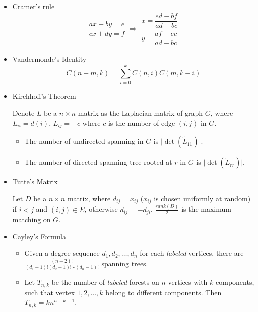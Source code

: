 \begin{itemize}
    \item Cramer's rule
    $$
    \begin{aligned}ax+by=e\\cx+dy=f\end{aligned}
    \Rightarrow
    \begin{aligned}x=\dfrac{ed-bf}{ad-bc}\\y=\dfrac{af-ec}{ad-bc}\end{aligned}
    $$
    
    \item Vandermonde's Identity
    $$
    C(n + m, k) = \sum_{i=0}^k C(n, i)C(m, k - i)
    $$
    
    \item Kirchhoff's Theorem
    
    Denote $L$ be a $n \times n$ matrix as the Laplacian matrix of graph $G$, where $L_{ii} = d(i)$, $L_{ij} = -c$ where $c$ is the number of edge $(i, j)$ in $G$.
    \begin{itemize}
        \itemsep-0.5em
        \item The number of undirected spanning in $G$ is $\lvert \det(\tilde{L}_{11}) \rvert$.
        \item The number of directed spanning tree rooted at $r$ in $G$ is $\lvert \det(\tilde{L}_{rr}) \rvert$.
    \end{itemize}
    
    \item Tutte's Matrix
    
    Let $D$ be a $n \times n$ matrix, where $d_{ij} = x_{ij}$ ($x_{ij}$ is chosen uniformly at random) if $i < j$ and $(i, j) \in E$, otherwise $d_{ij} = -d_{ji}$. $\frac{rank(D)}{2}$ is the maximum matching on $G$.
    
    \item Cayley's Formula
    
    \begin{itemize}
        \itemsep-0.5em
      \item Given a degree sequence $d_1, d_2, \ldots, d_n$ for each \textit{labeled} vertices, there are $\frac{(n - 2)!}{(d_1 - 1)!(d_2 - 1)!\cdots(d_n - 1)!}$ spanning trees.
      \item Let $T_{n, k}$ be the number of \textit{labeled} forests on $n$ vertices with $k$ components, such that vertex $1, 2, \ldots, k$ belong to different components. Then $T_{n, k} = kn^{n - k - 1}$.
    \end{itemize}
    

\end{itemize}
